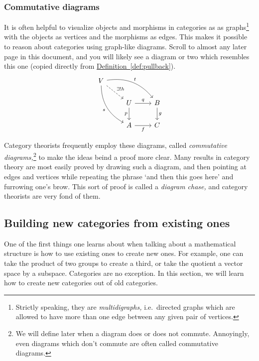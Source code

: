 \documentclass[main.tex]{subfiles}
\begin{document}
\subsubsection{Commutative diagrams}\label{sss:commutative_diagrams}

It is often helpful to visualize objects and morphisms in categories as as graphs\footnote{Strictly speaking, they are \emph{multidigraphs,} i.e.\ directed graphs which are allowed to have more than one edge between any given pair of vertices.} with the objects as vertices and the morphisms as edges. This makes it possible to reason about categories using graph-like diagrams. Scroll to almost any later page in this document, and you will likely see a diagram or two which resembles this one (copied directly from \hyperref[def:pullback]{Definition~\ref*{def:pullback}}).
\begin{equation*}
  \begin{tikzcd}
    V
    \arrow[rrd, bend left, "t"]
    \arrow[rd, dashed, "\exists!h"]
    \arrow[rdd, bend right, swap, "s"]
    \\
    & U
    \arrow[r, "q"]
    \arrow[d, swap, "p"]
    & B
    \arrow[d, "g"]
    \\
    & A
    \arrow[r, swap, "f"]
    & C
  \end{tikzcd}
\end{equation*}

Category theorists frequently employ these diagrams, called \emph{commutative diagrams,}\footnote{We will define later when a diagram does or does not commute. Annoyingly, even diagrams which don't commute are often called commutative diagrams.} to make the ideas beind a proof more clear. Many results in category theory are most easily proved by drawing such a diagram, and then pointing at edges and vertices while repeating the phrase `and then this goes here' and furrowing one's brow. This sort of proof is called a \emph{diagram chase,} and category theorists are very fond of them.


\subsection{Building new categories from existing ones}

One of the first things one learns about when talking about a mathematical structure is how to use existing ones to create new ones. For example, one can take the product of two groups to create a third, or take the quotient a vector space by a subspace. Categories are no exception. In this section, we will learn how to create new categories out of old categories.
\end{document}
